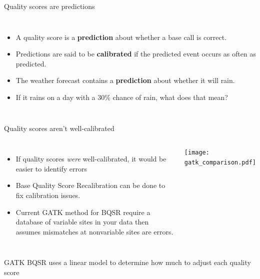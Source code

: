 \documentclass{beamer}
\begin{document}
\begin{frame}{Quality scores are predictions}
\begin{columns}
\begin{itemize}
\item A quality score is a \textbf{prediction} about whether a base call is correct.
\item Predictions are said to be \textbf{calibrated} if the predicted event occurs as often as predicted.
\item The weather forecast contains a \textbf{prediction} about whether it will rain.
\item If it rains on a day with a 30\% chance of rain, what does that mean?
\end{itemize}
\end{columns}
\end{frame}

\begin{frame}{Quality scores aren't well-calibrated}
\begin{columns}
\begin{itemize}
\item If quality scores \textit{were} well-calibrated, it would be easier to identify errors
\item Base Quality Score Recalibration can be done to fix calibration issues.
\item Current GATK method for BQSR require a database of variable sites in your data
then assumes mismatches at nonvariable sites are errors.
\end{itemize}
\texttt{[image: gatk\_comparison.pdf]}
\end{columns}
\end{frame}

\begin{frame}{GATK BQSR uses a linear model to determine how much to adjust each quality score}
\centering
{}
\end{frame}
\end{document}
